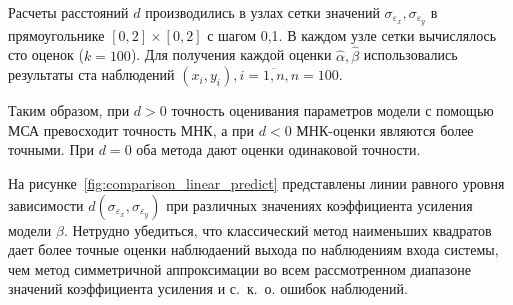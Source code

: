 Расчеты расстояний \( d \) производились в узлах сетки значений
\( \sigma_{\varepsilon_x}, \sigma_{\varepsilon_y} \) в прямоугольнике
\( [0, 2] \times [0, 2] \) с шагом 0{,}1.
В каждом узле сетки вычислялось сто оценок (\( k = 100 \)).
Для получения каждой оценки \( \hat{\alpha}, \hat{\beta} \) использовались результаты
ста наблюдений \( ( x_i, y_i ), i = \overline{1, n}, n = 100 \).

{\color{red}
Таким образом, при \( d > 0 \) точность оценивания параметров модели с помощью МСА
превосходит точность МНК, а при \( d < 0 \) МНК-оценки являются более точными.
При \( d = 0 \) оба метода дают оценки одинаковой точности.
}

На рисунке~\ref{fig:comparison_linear_predict} представлены линии равного уровня
зависимости \( d(\sigma_{\varepsilon_x}, \sigma_{\varepsilon_y}) \) при различных
значениях коэффициента усиления модели \( \beta \).
Нетрудно убедиться, что классический метод наименьших квадратов дает более точные оценки
наблюдаений выхода по наблюдениям входа системы, чем метод симметричной аппроксимации
во всем рассмотренном диапазоне значений коэффициента усиления и с.~к.~о. ошибок наблюдений.

